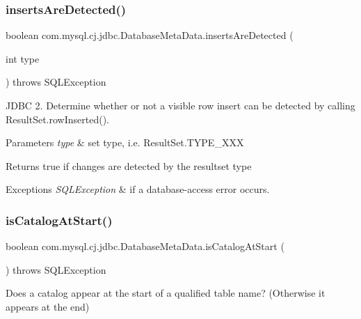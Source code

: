 \subsubsection{\texorpdfstring{inserts\+Are\+Detected()}{insertsAreDetected()}}
{\footnotesize\ttfamily boolean com.\+mysql.\+cj.\+jdbc.\+Database\+Meta\+Data.\+inserts\+Are\+Detected (\begin{DoxyParamCaption}\item[{int}]{type }\end{DoxyParamCaption}) throws S\+Q\+L\+Exception}

J\+D\+BC 2. Determine whether or not a visible row insert can be detected by calling Result\+Set.\+row\+Inserted().


\begin{DoxyParams}{Parameters}
{\em type} & set type, i.\+e. Result\+Set.\+T\+Y\+P\+E\+\_\+\+X\+XX \\
\hline
\end{DoxyParams}
\begin{DoxyReturn}{Returns}
true if changes are detected by the resultset type 
\end{DoxyReturn}

\begin{DoxyExceptions}{Exceptions}
{\em S\+Q\+L\+Exception} & if a database-\/access error occurs. \\
\hline
\end{DoxyExceptions}
\mbox{\label{classcom_1_1mysql_1_1cj_1_1jdbc_1_1_database_meta_data_a661d7d6feb31152148b6cdcb5b6b2ead}} 
\subsubsection{\texorpdfstring{is\+Catalog\+At\+Start()}{isCatalogAtStart()}}
{\footnotesize\ttfamily boolean com.\+mysql.\+cj.\+jdbc.\+Database\+Meta\+Data.\+is\+Catalog\+At\+Start (\begin{DoxyParamCaption}{ }\end{DoxyParamCaption}) throws S\+Q\+L\+Exception}

Does a catalog appear at the start of a qualified table name? (Otherwise it appears at the end)

